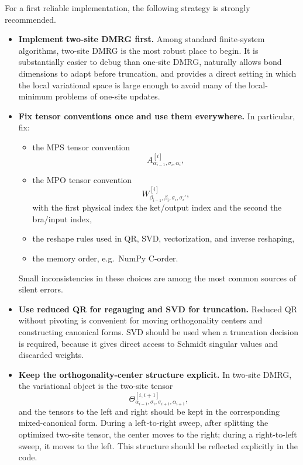 \documentclass[aps,prb,onecolumn,nofootinbib]{revtex4-2}
\begin{document}
	For a first reliable implementation, the following strategy is strongly recommended.
	
	\begin{itemize}
		\item \textbf{Implement two-site DMRG first.}
		Among standard finite-system algorithms, two-site DMRG is the most robust place to begin.
		It is substantially easier to debug than one-site DMRG, naturally allows bond dimensions to
		adapt before truncation, and provides a direct setting in which the local variational space is
		large enough to avoid many of the local-minimum problems of one-site updates.
		
		\item \textbf{Fix tensor conventions once and use them everywhere.}
		In particular, fix:
		\begin{itemize}
			\item the MPS tensor convention
			\[
			A^{[i]}_{\alpha_{i-1},\sigma_i,\alpha_i},
			\]
			\item the MPO tensor convention
			\[
			W^{[i]}_{\beta_{i-1},\beta_i,\sigma_i,\sigma_i'},
			\]
			with the first physical index the ket/output index and the second the bra/input index,
			\item the reshape rules used in QR, SVD, vectorization, and inverse reshaping,
			\item the memory order, e.g.\ NumPy C-order.
		\end{itemize}
		Small inconsistencies in these choices are among the most common sources of silent errors.
		
		\item \textbf{Use reduced QR for regauging and SVD for truncation.}
		Reduced QR without pivoting is convenient for moving orthogonality centers and constructing
		canonical forms. SVD should be used when a truncation decision is required, because it gives
		direct access to Schmidt singular values and discarded weights.
		
		\item \textbf{Keep the orthogonality-center structure explicit.}
		In two-site DMRG, the variational object is the two-site tensor
		\[
		\Theta^{[i,i+1]}_{\alpha_{i-1},\sigma_i,\sigma_{i+1},\alpha_{i+1}},
		\]
		and the tensors to the left and right should be kept in the corresponding mixed-canonical form.
		During a left-to-right sweep, after splitting the optimized two-site tensor, the center moves
		to the right; during a right-to-left sweep, it moves to the left. This structure should be
		reflected explicitly in the code.
		

\end{itemize}
\end{document}

